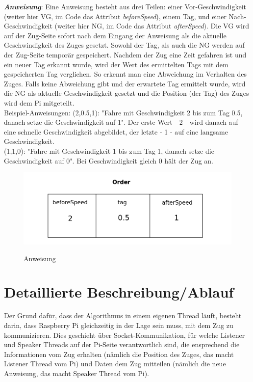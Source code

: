 \textit{\textbf{Anweisung}}: Eine Anweisung besteht aus drei Teilen: einer Vor-Geschwindigkeit (weiter hier VG, im Code das Attribut \textit{beforeSpeed}), einem Tag, und einer Nach-Geschwindigkeit (weiter hier NG, im Code das Attribut \textit{afterSpeed}). Die VG wird auf der Zug-Seite sofort nach dem Eingang der Anweisung als die aktuelle Geschwindigkeit des Zuges gesetzt. Sowohl der Tag, als auch die NG werden auf der Zug-Seite temporär gespeichert. Nachdem der Zug eine Zeit gefahren ist und ein neuer Tag erkannt wurde, wird der Wert des ermittelten Tags mit dem gespeicherten Tag verglichen. So erkennt man eine Abweichung im Verhalten des Zuges. Falls keine Abweichung gibt und der erwartete Tag ermittelt wurde, wird die NG als aktuelle Geschwindigkeit gesetzt und die Position (der Tag) des Zuges wird dem Pi mitgeteilt.\\ 
Beispiel-Anweisungen: (2,0.5,1): "Fahre mit Geschwindigkeit 2 bis zum Tag 0.5, danach setze die Geschwindigkeit auf 1". Der erste Wert - 2 - wird danach auf eine schnelle Geschwindigkeit abgebildet, der letzte - 1 - auf eine langsame Geschwindigkeit.\\
(1,1,0): "Fahre mit Geschwindigkeit 1 bis zum Tag 1, danach setze die Geschwindigkeit auf 0". Bei Geschwindigkeit gleich 0 hält der Zug an.\\
\begin{figure}[H]	
\caption{Anweisung}
\includegraphics[width=2\textwidth, width=330pt]{content/images/order.png}
\label{pic:anweisung}
\end{figure}


\section{Detaillierte Beschreibung/Ablauf}
Der Grund dafür, dass der Algorithmus in einem eigenen Thread läuft, besteht darin, dass Raspberry Pi gleichzeitig in der Lage sein muss, mit dem Zug zu kommunizieren. Dies geschieht über Socket-Kommunikation, für welche Listener und Speaker Threads auf der Pi-Seite verantwortlich sind, die ensprechend die Informationen vom Zug erhalten (nämlich die Position des Zuges, das macht Listener Thread vom Pi) und Daten dem Zug mitteilen (nämlich die neue Anweisung, das macht Speaker Thread vom Pi). \\

